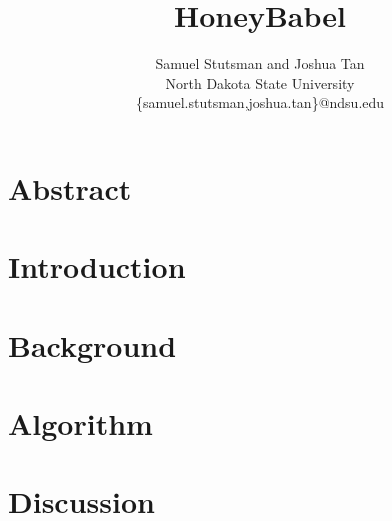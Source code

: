 \documentclass[12pt]{article}
\begin{document}
\pagestyle{plain}

\title{HoneyBabel}

\author{
Samuel Stutsman and Joshua Tan\\
North Dakota State University\\
\{samuel.stutsman,joshua.tan\}@ndsu.edu
}
\date{} 

\maketitle
\thispagestyle{empty}

\section*{\centering Abstract}


\newpage
\setcounter{page}{1}

\section*{Introduction}



\section*{Background}


\section*{Algorithm}


\section*{Discussion}


\nocite{5207658}
 


\end{document}
